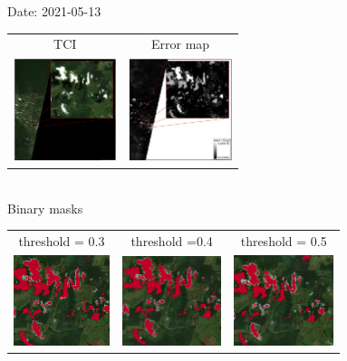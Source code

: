 \documentclass{beamer}
\begin{document}
\begin{frame}{Date: 2021-05-13}
    \centering
        \begin{tabular}{cc}
        TCI & Error map\\
        \includegraphics[width=3cm]{Figures/v3/20210513/111-TCI_with_zoom_roi2.pdf}
        &
        \includegraphics[width=3cm]{Figures/v3/20210513/222-error_map_with_zoom_roi2.pdf}
    \end{tabular}
    \\
    \centering
        Binary masks
        \begin{tabular}{ccc}
            threshold = 0.3  & threshold =0.4 &  threshold = 0.5 \\
        \includegraphics[width=2.8cm]{Figures/v3/20210513/binary_mask_umbral_03/zoom2.png}
        &
        \includegraphics[width=2.9cm]{Figures/v3/20210513/binary_mask_umbral_04/zoom2.png}
        &
        \includegraphics[width=2.9cm]{Figures/v3/20210513/binary_mask_umbral_05/33-binary_mask_zoom2.png}
        \end{tabular}
    \end{frame}
\end{document}
